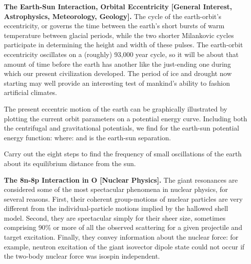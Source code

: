 {\begin{one-digit-list}
\item [2.] {\bf The Earth-Sun Interaction, Orbital Eccentricity
[General Interest, Astrophysics, Meteorology, Geology].}
The cycle of the earth-orbit's eccentricity, or  governs
the time between the earth's short bursts of warm temperature between
glacial periods, while the two shorter Milankovic cycles participate in
determining the height and width of these pulses.
%
%
The earth-orbit eccentricity oscillates on a (roughly) 93,000 year cycle, so
it will be about that amount of time before the earth has another 
like the just-ending one during which our present civilization developed.
The period of ice and drought now starting may well provide an interesting
test of mankind's ability to fashion artificial climates.%
%
%

The present eccentric motion of the earth can be graphically illustrated by
plotting the current orbit parameters on a potential energy curve.
Including both the centrifugal and gravitational potentials, we find for the
earth-sun potential energy function:
%
%
where:
%
%
%
%
%
and  is the earth-sun separation.

Carry out the eight steps to find the frequency of small oscillations of the
earth about its equilibrium distance from the sun.

\item [3.] {\bf The 8n-8p Interaction in O  [Nuclear Physics].}
The giant resonances are considered some of the most spectacular phenomena in
nuclear physics, for several reasons.
First, their coherent group-motions of nuclear particles are very different
from the individual-particle motions implied by the hallowed shell model.
Second, they are spectacular simply for their sheer size, sometimes
comprising 90\% or more of all the observed scattering for a given projectile
and target excitation.
Finally, they convey information about the nuclear force: for example,
neutron excitation of the giant isovector dipole state could not occur if
the two-body nuclear force was isospin independent.


\end{one-digit-list}}
